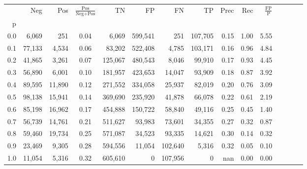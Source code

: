 \begin{tabular}{rrrcrrrrrrrrrrr}
\toprule
{} &     Neg &     Pos & $\frac{\text{Pos}}{\text{Neg}+\text{Pos}}$ &       TN &       FP &       FN &       TP &  Prec &   Rec & $\frac{\text{FP}}{\text{P}}$ \\
p   &         &         &                                            &          &          &          &          &       &       &                              \\
\midrule
0.0 &   6,069 &     251 &                                       0.04 &    6,069 &  599,541 &      251 &  107,705 &  0.15 &  1.00 &                         5.55 \\
0.1 &  77,133 &   4,534 &                                       0.06 &   83,202 &  522,408 &    4,785 &  103,171 &  0.16 &  0.96 &                         4.84 \\
0.2 &  41,865 &   3,261 &                                       0.07 &  125,067 &  480,543 &    8,046 &   99,910 &  0.17 &  0.93 &                         4.45 \\
0.3 &  56,890 &   6,001 &                                       0.10 &  181,957 &  423,653 &   14,047 &   93,909 &  0.18 &  0.87 &                         3.92 \\
0.4 &  89,595 &  11,890 &                                       0.12 &  271,552 &  334,058 &   25,937 &   82,019 &  0.20 &  0.76 &                         3.09 \\
0.5 &  98,138 &  15,941 &                                       0.14 &  369,690 &  235,920 &   41,878 &   66,078 &  0.22 &  0.61 &                         2.19 \\
0.6 &  85,198 &  16,962 &                                       0.17 &  454,888 &  150,722 &   58,840 &   49,116 &  0.25 &  0.45 &                         1.40 \\
0.7 &  56,739 &  14,761 &                                       0.21 &  511,627 &   93,983 &   73,601 &   34,355 &  0.27 &  0.32 &                         0.87 \\
0.8 &  59,460 &  19,734 &                                       0.25 &  571,087 &   34,523 &   93,335 &   14,621 &  0.30 &  0.14 &                         0.32 \\
0.9 &  23,469 &   9,305 &                                       0.28 &  594,556 &   11,054 &  102,640 &    5,316 &  0.32 &  0.05 &                         0.10 \\
1.0 &  11,054 &   5,316 &                                       0.32 &  605,610 &        0 &  107,956 &        0 &   nan &  0.00 &                         0.00 \\
\bottomrule
\end{tabular}
